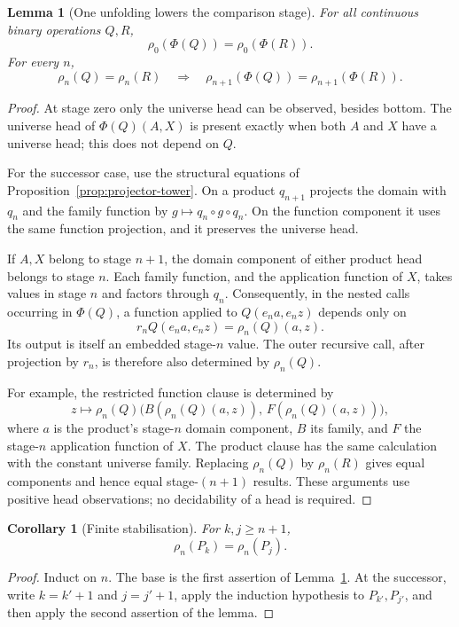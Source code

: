\documentclass[11pt,a4paper]{article}
\newtheorem{lemma}[theorem]{Lemma}
\newtheorem{corollary}[theorem]{Corollary}
\theoremstyle{definition}
\theoremstyle{remark}
\begin{document}
\begin{lemma}[One unfolding lowers the comparison stage]\label{lem:fusion}
For all continuous binary operations $Q,R$,
\[
 \rho_0(\Phi(Q))=\rho_0(\Phi(R)).
\]
For every $n$,
\[
 \rho_n(Q)=\rho_n(R)
 \quad\Longrightarrow\quad
 \rho_{n+1}(\Phi(Q))=\rho_{n+1}(\Phi(R)).
\]
\end{lemma}
\begin{proof}
At stage zero only the universe head can be observed, besides bottom.
The universe head of $\Phi(Q)(A,X)$ is present exactly when both $A$
and $X$ have a universe head; this does not depend on $Q$.

For the successor case, use the structural equations of
Proposition~\ref{prop:projector-tower}. On a product $q_{n+1}$ projects the domain with $q_n$ and the
family function by $g\mapsto q_n\circ g\circ q_n$. On the function
component it uses the same function projection, and it preserves the
universe head.

If $A,X$ belong to stage $n+1$, the domain component of either product
head belongs to stage $n$. Each family function, and the application
function of $X$, takes values in stage $n$ and factors through $q_n$.
Consequently, in the nested calls occurring in $\Phi(Q)$, a function
applied to $Q(e_n a,e_n z)$ depends only on
\[
 r_n Q(e_n a,e_n z)=\rho_n(Q)(a,z).
\]
Its output is itself an embedded stage-$n$ value. The outer recursive
call, after projection by $r_n$, is therefore also determined by
$\rho_n(Q)$.

For example, the restricted function clause is determined by
\[
 z\longmapsto
 \rho_n(Q)\bigl(B(\rho_n(Q)(a,z)),\,F(\rho_n(Q)(a,z))\bigr),
\]
where $a$ is the product's stage-$n$ domain component, $B$ its family,
and $F$ the stage-$n$ application function of $X$. The product clause
has the same calculation with the constant universe family. Replacing
$\rho_n(Q)$ by $\rho_n(R)$ gives equal components and hence equal
stage-$(n+1)$ results. These arguments use positive head observations;
no decidability of a head is required.
\end{proof}

\begin{corollary}[Finite stabilisation]\label{cor:stabilisation}
For $k,j\geq n+1$,
\[
 \rho_n(P_k)=\rho_n(P_j).
\]
\end{corollary}
\begin{proof}
Induct on $n$. The base is the first assertion of
Lemma~\ref{lem:fusion}. At the successor, write $k=k'+1$ and $j=j'+1$,
apply the induction hypothesis to $P_{k'},P_{j'}$, and then apply the
second assertion of the lemma.
\end{proof}
\end{document}
